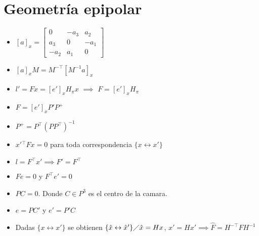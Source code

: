 \documentclass[12pt,a4paper]{article}
\begin{document}
\section{Geometr\'ia epipolar}

\begin{itemize}
	\item $[a]_{x} = \left[ {\begin{smallmatrix}
		0 & -a_3 & a_2\\ 
		a_3  & 0 & -a_1\\
		-a_2 & a_1 & 0
		\end{smallmatrix} } \right] $

	\item $[a]_{x}M = M^{-\top}[M^{-1}a]_{x}$

	\item $l' = Fx = [e']_{x} H_{\pi} x$ $\implies$ $F = [e']_{x} H_{\pi}$

	\item $F = [e']_{x} P' P^{+}$

	\item $P^{+} = P^{\top}(PP^{\top})^{-1}$

	\item ${x'}{}^{\top}Fx =0$ para toda correspondencia $\{x \leftrightarrow x' \}$

	\item $l = F^{\top}x' \implies F' = F^{\top}$

	\item $Fe = 0$ y $F^{\top}e' = 0$

	\item $PC = 0$. Donde $C \in P^{3}$ es el centro de la camara.

	\item $e = PC'$ y $e' = P'C$

	\item Dadas $\{x \leftrightarrow x' \}$ se obtienen  $\{\hat{x} \leftrightarrow \hat{x}' \} \diagup \hat{x} = Hx$, $\hat{x}'=Hx'  \implies \hat{F} = H^{-\top}FH^{-1}$

\end{itemize}
\end{document}
